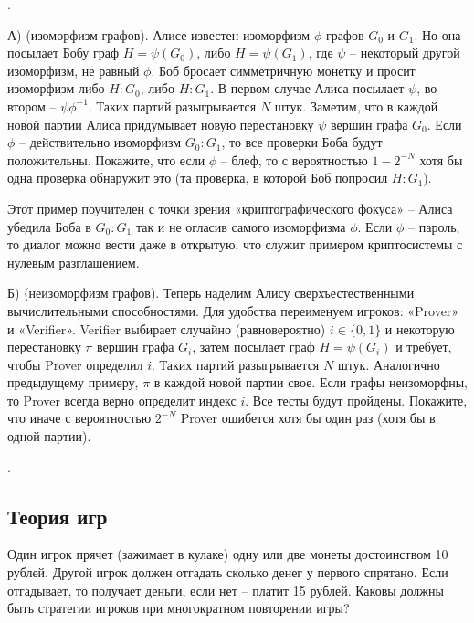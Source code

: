 \begin{problem}. 

А) (изоморфизм графов). Алисе известен изоморфизм $\phi$ графов $G_0$ и $G_1$. Но она посылает Бобу граф $H =\psi(G_0)$, либо $H =\psi(G_1)$, где $\psi$ – некоторый другой изоморфизм, не равный $\phi$. Боб бросает симметричную монетку и просит изоморфизм либо $H : G_0$, либо $H : G_1$. В первом случае Алиса посылает  $\psi$, во втором – $\psi \phi^{-1}$. Таких партий разыгрывается $N$ штук. Заметим, что в каждой новой партии Алиса придумывает новую перестановку $\psi$   вершин графа $G_0$. Если $\phi$  – действительно изоморфизм $G_0 : G_1$, то все проверки Боба будут положительны.
Покажите, что если $\phi$ – блеф, то с вероятностью  $1 - 2^{-N}$  хотя бы одна проверка обнаружит это (та проверка, в которой Боб попросил $H : G_1$).

\begin{remark}
Этот пример поучителен с точки зрения «криптографического фокуса» – Алиса убедила Боба в $G_0 : G_1$ так и не огласив самого изоморфизма $\phi$. Если $\phi$ – пароль, то диалог можно вести даже в открытую, что служит примером криптосистемы с нулевым разглашением.
\end{remark}

Б) (неизоморфизм графов). Теперь наделим Алису сверхъестественными вычислительными способностями. Для удобства переименуем игроков: «Prover» и «Verifier». Verifier выбирает случайно (равновероятно) $ i \in \lbrace 0, 1 \rbrace$ и некоторую перестановку $\pi$ вершин графа $G_i$, затем посылает граф $H =\psi(G_i)$ и требует, чтобы Prover определил $i$. Таких партий разыгрывается $N$ штук. Аналогично предыдущему примеру, $\pi$ в каждой новой партии свое. Если графы неизоморфны, то Prover всегда верно определит индекс $i$. Все тесты будут пройдены. Покажите, что иначе с вероятностью $2^{-N}$  Prover ошибется хотя бы один раз (хотя бы в одной партии).
 
\end{problem}

\begin{problem}.
\end{problem}



\subsection{Теория игр}
\begin{problem}
Один игрок прячет (зажимает в кулаке) одну или две монеты достоинством 10 рублей. Другой игрок должен отгадать сколько денег у первого спрятано. Если отгадывает, то получает деньги, если нет -- платит 15 рублей. Каковы  должны быть стратегии игроков при многократном повторении игры?

\end{problem}


